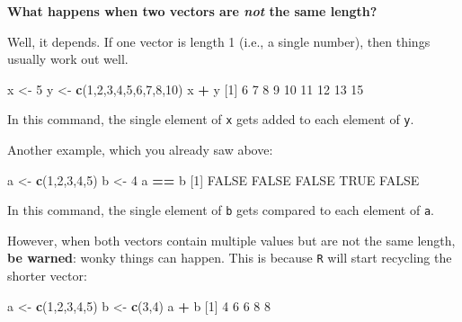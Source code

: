 \documentclass[
]{book}
\newenvironment{Shaded}{\begin{snugshade}}{\end{snugshade}}
\newcommand{\DecValTok}[1]{\textcolor[rgb]{0.00,0.00,0.81}{#1}}
\newcommand{\KeywordTok}[1]{\textcolor[rgb]{0.13,0.29,0.53}{\textbf{#1}}}
\newcommand{\NormalTok}[1]{#1}
\newcommand{\OperatorTok}[1]{\textcolor[rgb]{0.81,0.36,0.00}{\textbf{#1}}}
\newcommand{\OtherTok}[1]{\textcolor[rgb]{0.56,0.35,0.01}{#1}}
\newcommand{\StringTok}[1]{\textcolor[rgb]{0.31,0.60,0.02}{#1}}
\begin{document}
\textbf{What happens when two vectors are \emph{not} the same length?}

Well, it depends. If one vector is length 1 (i.e., a single number), then things usually work out well.

\begin{Shaded}
\begin{Highlighting}[]
\NormalTok{x <-}\StringTok{ }\DecValTok{5}
\NormalTok{y <-}\StringTok{ }\KeywordTok{c}\NormalTok{(}\DecValTok{1}\NormalTok{,}\DecValTok{2}\NormalTok{,}\DecValTok{3}\NormalTok{,}\DecValTok{4}\NormalTok{,}\DecValTok{5}\NormalTok{,}\DecValTok{6}\NormalTok{,}\DecValTok{7}\NormalTok{,}\DecValTok{8}\NormalTok{,}\DecValTok{10}\NormalTok{)}
\NormalTok{x }\OperatorTok{+}\StringTok{ }\NormalTok{y}
\NormalTok{[}\DecValTok{1}\NormalTok{]  }\DecValTok{6}  \DecValTok{7}  \DecValTok{8}  \DecValTok{9} \DecValTok{10} \DecValTok{11} \DecValTok{12} \DecValTok{13} \DecValTok{15}
\end{Highlighting}
\end{Shaded}

In this command, the single element of \texttt{x} gets added to each element of \texttt{y}.

Another example, which you already saw above:

\begin{Shaded}
\begin{Highlighting}[]
\NormalTok{a <-}\StringTok{ }\KeywordTok{c}\NormalTok{(}\DecValTok{1}\NormalTok{,}\DecValTok{2}\NormalTok{,}\DecValTok{3}\NormalTok{,}\DecValTok{4}\NormalTok{,}\DecValTok{5}\NormalTok{)}
\NormalTok{b <-}\StringTok{ }\DecValTok{4}
\NormalTok{a }\OperatorTok{==}\StringTok{ }\NormalTok{b}
\NormalTok{[}\DecValTok{1}\NormalTok{] }\OtherTok{FALSE} \OtherTok{FALSE} \OtherTok{FALSE}  \OtherTok{TRUE} \OtherTok{FALSE}
\end{Highlighting}
\end{Shaded}

In this command, the single element of \texttt{b} gets compared to each element of \texttt{a}.

However, when both vectors contain multiple values but are not the same length, \textbf{be warned}: wonky things can happen. This is because \texttt{R} will start recycling the shorter vector:

\begin{Shaded}
\begin{Highlighting}[]
\NormalTok{a <-}\StringTok{ }\KeywordTok{c}\NormalTok{(}\DecValTok{1}\NormalTok{,}\DecValTok{2}\NormalTok{,}\DecValTok{3}\NormalTok{,}\DecValTok{4}\NormalTok{,}\DecValTok{5}\NormalTok{)}
\NormalTok{b <-}\StringTok{ }\KeywordTok{c}\NormalTok{(}\DecValTok{3}\NormalTok{,}\DecValTok{4}\NormalTok{)}
\NormalTok{a }\OperatorTok{+}\StringTok{ }\NormalTok{b}
\NormalTok{[}\DecValTok{1}\NormalTok{] }\DecValTok{4} \DecValTok{6} \DecValTok{6} \DecValTok{8} \DecValTok{8}
\end{Highlighting}
\end{Shaded}
\end{document}
